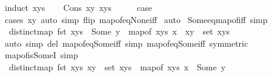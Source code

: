 \begin{isabellebody}
%
\isadelimproof
%
\endisadelimproof
%
\isatagproof
{}\isamarkupfalse%
\ {\isacharparenleft}{\kern0pt}induct\ xys{\isacharparenright}{\kern0pt}\isanewline
\ \ \isamarkupfalse%
\ {\isacharparenleft}{\kern0pt}Cons\ xy\ xys{\isacharparenright}{\kern0pt}\isanewline
\ \ \isamarkupfalse%
\ \isamarkupfalse%
\ {\isacharquery}{\kern0pt}case\isanewline
\ \ \ \ \isamarkupfalse%
\ {\isacharparenleft}{\kern0pt}cases\ xy{\isacharparenright}{\kern0pt}\ {\isacharparenleft}{\kern0pt}auto\ simp\ flip{\isacharcolon}{\kern0pt}\ map{\isacharunderscore}{\kern0pt}of{\isacharunderscore}{\kern0pt}eq{\isacharunderscore}{\kern0pt}None{\isacharunderscore}{\kern0pt}iff{\isacharparenright}{\kern0pt}\isanewline
{}\isamarkupfalse%
\ auto%
\endisatagproof
{\isafoldproof}%
%
\isadelimproof
\isanewline
%
\endisadelimproof
\isanewline
{}\isamarkupfalse%
\ Some{\isacharunderscore}{\kern0pt}eq{\isacharunderscore}{\kern0pt}map{\isacharunderscore}{\kern0pt}of{\isacharunderscore}{\kern0pt}iff\ {\isacharbrackleft}{\kern0pt}simp{\isacharbrackright}{\kern0pt}{\isacharcolon}{\kern0pt}\isanewline
\ \ {\isachardoublequoteopen}distinct{\isacharparenleft}{\kern0pt}map\ fst\ xys{\isacharparenright}{\kern0pt}\ {\isasymLongrightarrow}\ {\isacharparenleft}{\kern0pt}Some\ y\ {\isacharequal}{\kern0pt}\ map{\isacharunderscore}{\kern0pt}of\ xys\ x{\isacharparenright}{\kern0pt}\ {\isacharequal}{\kern0pt}\ {\isacharparenleft}{\kern0pt}{\isacharparenleft}{\kern0pt}x{\isacharcomma}{\kern0pt}y{\isacharparenright}{\kern0pt}\ {\isasymin}\ set\ xys{\isacharparenright}{\kern0pt}{\isachardoublequoteclose}\isanewline
%
\isadelimproof
%
\endisadelimproof
%
\isatagproof
{}\isamarkupfalse%
\ {\isacharparenleft}{\kern0pt}auto\ simp\ del{\isacharcolon}{\kern0pt}\ map{\isacharunderscore}{\kern0pt}of{\isacharunderscore}{\kern0pt}eq{\isacharunderscore}{\kern0pt}Some{\isacharunderscore}{\kern0pt}iff\ simp{\isacharcolon}{\kern0pt}\ map{\isacharunderscore}{\kern0pt}of{\isacharunderscore}{\kern0pt}eq{\isacharunderscore}{\kern0pt}Some{\isacharunderscore}{\kern0pt}iff\ {\isacharbrackleft}{\kern0pt}symmetric{\isacharbrackright}{\kern0pt}{\isacharparenright}{\kern0pt}%
\endisatagproof
{\isafoldproof}%
%
\isadelimproof
\isanewline
%
\endisadelimproof
\isanewline
{}\isamarkupfalse%
\ map{\isacharunderscore}{\kern0pt}of{\isacharunderscore}{\kern0pt}is{\isacharunderscore}{\kern0pt}SomeI\ {\isacharbrackleft}{\kern0pt}simp{\isacharbrackright}{\kern0pt}{\isacharcolon}{\kern0pt}\ \isanewline
\ \ {\isachardoublequoteopen}{\isasymlbrakk}distinct{\isacharparenleft}{\kern0pt}map\ fst\ xys{\isacharparenright}{\kern0pt}{\isacharsemicolon}{\kern0pt}\ {\isacharparenleft}{\kern0pt}x{\isacharcomma}{\kern0pt}y{\isacharparenright}{\kern0pt}\ {\isasymin}\ set\ xys{\isasymrbrakk}\ {\isasymLongrightarrow}\ map{\isacharunderscore}{\kern0pt}of\ xys\ x\ {\isacharequal}{\kern0pt}\ Some\ y{\isachardoublequoteclose}\isanewline

\end{isabellebody}
